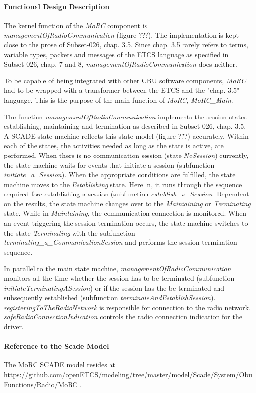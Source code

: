 \paragraph{Functional Design Description}

The kernel function of the \textit{MoRC} component is \emph{managementOfRadioCommunication} (figure ???). The implementation is kept close to the prose of Subset-026, chap. 3.5. Since chap. 3.5 rarely refers to terms, variable types, packets and messages of the ETCS language as specified in Subset-026, chap. 7 and 8, \emph{managementOfRadioCommunication} does neither. 

To be capable of being integrated with other OBU software components, \emph{MoRC} had to be wrapped with a transformer between the ETCS and the "chap. 3.5" language. This is the purpose of the main function of \emph{MoRC}, \emph{MoRC\_Main}. 



The function \emph{managementOfRadioCommunication} implements the session states establishing, maintaining and termination as described in Subset-026, chap. 3.5. A SCADE state machine reflects this state model (figure ???) accurately. Within each of the states, the activities needed as long as the state is active, are performed. When there is no communication session (state \emph{NoSession}) currently, the state machine waits for events that initiate a session (subfunction \emph{initiate\_a\_Session}). When the appropriate conditions are fulfilled, the state machine moves to the \textit{Establishing} state. Here in, it runs through the sequence required fore establishing a session (subfunction \emph{establish\_a\_Session}. Dependent on the results, the state machine changes over to the \emph{Maintaining} or \emph{Terminating} state. While in \emph{Maintaining}, the communication connection is monitored. When an event triggering the session termination occurs, the state machine switches to the state \emph{Terminating} with the subfunction \emph{terminating\_a\_CommunicationSession} and performs the session termination sequence. 

In parallel to the main state machine, \emph{managementOfRadioCommunication} monitors all the time whether the session has to be terminated (subfunction \emph{initiateTerminatingASession}) or if the session has the be terminated and subsequently established (subfunction \emph{terminateAndEstablishSession}). \emph{registeringToTheRadioNetwork} is responsible for connection to the radio network. \emph{safeRadioConnectionIndication} controls the radio connection indication for the driver.


\paragraph{Reference to the Scade Model}

The MoRC SCADE model resides at \url{https://github.com/openETCS/modeling/tree/master/model/Scade/System/ObuFunctions/Radio/MoRC} .






